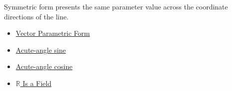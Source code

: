 \begin{remark*}[Interpretation]
Symmetric form presents the same parameter value across the coordinate
directions of the line.
\end{remark*}

\begin{dependencies}
\begin{itemize}
  \item \hyperref[def:vector-parametric-form]{Vector Parametric Form}
  \item \hyperref[def:acute-angle-sine]{Acute-angle sine}
  \item \hyperref[def:acute-angle-cosine]{Acute-angle cosine}
  \item \hyperref[thm:r-is-a-field]{$\mathbb{R}$ Is a Field}
\end{itemize}
\end{dependencies}
